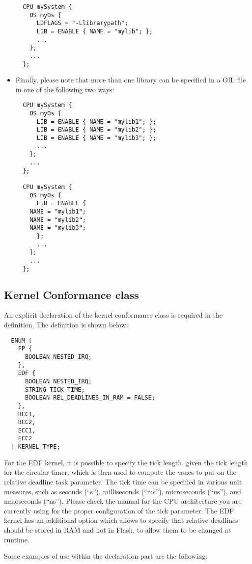 \begin{itemize}
\begin{lstlisting}
  CPU mySystem {
    OS myOs {
      LDFLAGS = "-Llibrarypath";
      LIB = ENABLE { NAME = "mylib"; };
      ...
    };
    ...
  };
\end{lstlisting}

\item
  Finally, please note that more than one library can be specified in
  a OIL file in one of the following two ways:
\begin{lstlisting}
  CPU mySystem {
    OS myOs {
      LIB = ENABLE { NAME = "mylib1"; };
      LIB = ENABLE { NAME = "mylib2"; };
      LIB = ENABLE { NAME = "mylib3"; };
      ...
    };
    ...
  };

  CPU mySystem {
    OS myOs {
      LIB = ENABLE {
	NAME = "mylib1"; 
	NAME = "mylib2"; 
	NAME = "mylib3"; 
      };
      ...
    };
    ...
  };
\end{lstlisting}

\end{itemize}


\subsection{Kernel Conformance class}

An explicit declaration of the kernel conformance class is required in
the  definition. The definition is shown below:

\begin{lstlisting}
  ENUM [
    FP {
      BOOLEAN NESTED_IRQ;
    },
    EDF {
      BOOLEAN NESTED_IRQ;
      STRING TICK_TIME; 
      BOOLEAN REL_DEADLINES_IN_RAM = FALSE;
    },
    BCC1,
    BCC2,
    ECC1,
    ECC2
  ] KERNEL_TYPE;
\end{lstlisting}

For the EDF kernel, it is possible to specify the tick
length. given the tick length for the circular timer, which is then
used to compute the vaues to put on the relative deadline task
parameter. The tick time can be specified in various unit measures,
such as seconds (``s''), milliseconds (``ms''), microseconds (``us''),
and nanoseconds (``ns''). Please check the manual for the CPU
architecture you are currently using for the proper configuration of
the tick parameter. The EDF kernel has an additional option which
allows to specify that relative deadlines should be stored in RAM and
not in Flash, to allow them to be changed at runtime.

Some examples of use within the declaration part are the following:

